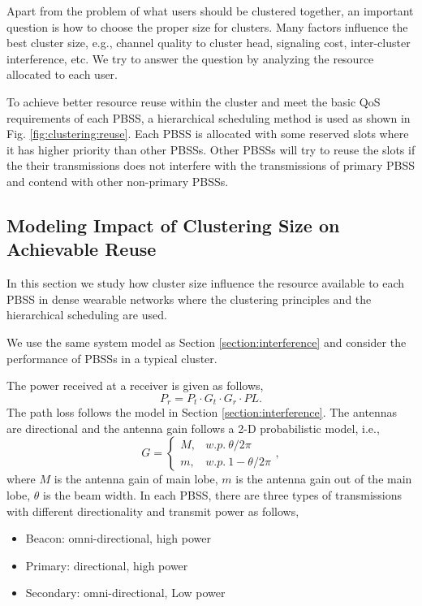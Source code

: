 \documentclass[10pt, conference, letterpaper]{IEEEtran}
\begin{document}
Apart from the problem of what users should be clustered together, an important question is how to choose the proper size for clusters. Many factors influence the best cluster size, e.g., channel quality to cluster head, signaling cost, inter-cluster interference, etc. We try to answer the question by analyzing the resource allocated to each user. 

To achieve better resource reuse within the cluster and meet the basic QoS requirements of each PBSS, a hierarchical scheduling method is used as shown in Fig. \ref{fig:clustering:reuse}. Each PBSS is allocated with some reserved slots where it has higher priority than other PBSSs. Other PBSSs will try to reuse the slots if the their transmissions does not interfere with the transmissions of primary PBSS and contend with other non-primary PBSSs.

\subsection{Modeling Impact of Clustering Size on Achievable Reuse}
In this section we study how cluster size influence the resource available to each PBSS in dense wearable networks where the clustering principles and the hierarchical scheduling are used. 

We use the same system model as Section \ref{section:interference} and consider the performance of PBSSs in a typical cluster. 

The power received at a receiver is given as follows,
\begin{equation*}
P_r = P_t\cdot G_t\cdot G_r \cdot PL.
\end{equation*}
The path loss follows the model in Section \ref{section:interference}. The antennas are directional and the antenna gain follows a 2-D probabilistic model, i.e., 
\begin{equation*}
G = 
\begin{cases}
M, & w.p. ~ \theta/2\pi \\
m, & w.p. ~ 1-\theta/2\pi
\end{cases},
\end{equation*}
where $M$ is the antenna gain of main lobe, $m$ is the antenna gain out of the main lobe, $\theta$ is the beam width.
In each PBSS, there are three types of transmissions with different directionality and transmit power as follows,
\begin{itemize}
	\item Beacon: omni-directional, high power
	\item Primary: directional, high power
	\item Secondary: omni-directional, Low power
\end{itemize}
\end{document}

